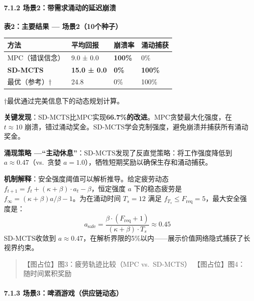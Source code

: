 \documentclass[UTF8]{ctexart}
\let\oldparagraph\paragraph
\renewcommand{\paragraph}[1]{\oldparagraph{#1}\mbox{}}
\begin{document}
\hypertarget{ux573aux666f2ux5e26ux9700ux6c42ux6d8cux52a8ux7684ux5ef6ux8fdfux5d29ux6e83-1}{%
\paragraph{7.1.2
场景2：带需求涌动的延迟崩溃}\label{ux573aux666f2ux5e26ux9700ux6c42ux6d8cux52a8ux7684ux5ef6ux8fdfux5d29ux6e83-1}}

\textbf{表2：主要结果 --- 场景2（10个种子）}

\begin{table}[h]
\centering
\begin{tabular}{p{4cm}p{3.5cm}p{2.5cm}p{3.5cm}}
\toprule
\textbf{方法} & \textbf{平均回报} & \textbf{崩溃率} & \textbf{涌动捕获} \\
\midrule
MPC（错误信念） & 9.0 ± 0.0 & \textbf{100\%} & 0\% \\
\textbf{SD-MCTS} & \textbf{15.0 ± 0.0} & \textbf{0\%} & \textbf{100\%} \\
最优（参考）† & 24.8 & 0\% & 100\% \\
\bottomrule
\end{tabular}
\end{table}

†最优通过完美信息下的动态规划计算。

\textbf{关键发现}：SD-MCTS比MPC实现\textbf{66.7\%的改进}。MPC贪婪最大化强度，在
\(t \approx 10\)
崩溃，错过涌动奖金。SD-MCTS学会克制强度，避免崩溃并捕获所有涌动奖金。

\textbf{涌现策略
---``主动休息''}：SD-MCTS发现了反直觉策略：将工作强度降低到
\(a \approx 0.47\)（vs.~贪婪
\(a = 1.0\)），牺牲短期奖励以确保生存和涌动捕获。

\textbf{机制解释}：安全强度阈值可以解析推导。给定疲劳动态
\(f_{t+1} = f_t + (\kappa + \beta) \cdot a_t - \beta\)，恒定强度 \(a\)
下的稳态疲劳是
\(f_\infty = (\kappa + \beta) a / \beta - 1\)。为在涌动时间 \(T_s = 12\)
满足 \(f_{T_s} \leq F_{\text{req}} = 5\)，最大安全强度是：
\[a_{\text{safe}} = \frac{\beta \cdot (F_{\text{req}} + 1)}{(\kappa + \beta) \cdot T_s} \approx 0.45\]
SD-MCTS收敛到
\(a \approx 0.47\)，在解析界限的5\%以内------展示价值网络隐式捕获了长视界约束。

\begin{quote}
【图占位】图3：疲劳轨迹比较（MPC vs.~SD-MCTS）
【图占位】图4：随时间累积奖励
\end{quote}

\hypertarget{ux573aux666f3ux5564ux9152ux6e38ux620fux4f9bux5e94ux94feux52a8ux6001}{%
\paragraph{7.1.3
场景3：啤酒游戏（供应链动态）}\label{ux573aux666f3ux5564ux9152ux6e38ux620fux4f9bux5e94ux94feux52a8ux6001}}
\end{document}
